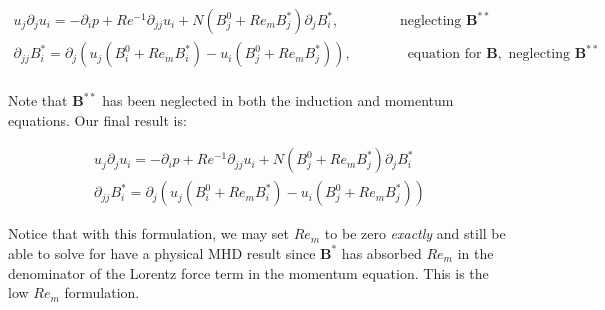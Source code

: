 \documentclass[11pt]{article}
\newcommand{\B}{\mathbf{B}}
\newcommand{\PD}{\partial}
\begin{document}
\begin{equation}\begin{aligned}
u_j\PD_j u_i =-\PD_i p+ Re^{-1} \PD_{jj} u_i + N (B_j^0+Re_m B_j^*) \PD_j B_i^*, \qquad \qquad \text{ neglecting } \B^{**}  \\
\PD_{jj} B_i^{*}  = \PD_j (u_j (B_i^0 + Re_m B_i^*) - u_i (B_j^0+Re_m B_j^*)), \qquad \qquad \text{equation for } \B, \text{ neglecting } \B^{**} \\
\end{aligned} \end{equation}

Note that $\B^{**}$ has been neglected in both the induction and momentum equations. Our final result is:

\begin{equation}\boxed{\begin{aligned}
u_j\PD_j u_i =-\PD_i p+ Re^{-1} \PD_{jj} u_i + N (B_j^0+Re_m B_j^*) \PD_j B_i^* \\
\PD_{jj} B_i^* = \PD_j (u_j (B_i^0 + Re_m B_i^{*}) - u_i (B_j^0+Re_m B_j^{*}))
\end{aligned}}\end{equation}

Notice that with this formulation, we may set $Re_m$ to be zero \textit{exactly} and still be able to solve for have a physical MHD result since $\B^*$ has absorbed $Re_m$ in the denominator of the Lorentz force term in the momentum equation. This is the low $Re_m$ formulation.
\end{document}
